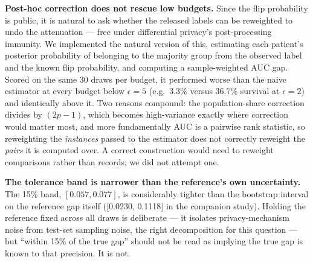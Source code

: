 \documentclass[11pt]{article}
\begin{document}
\textbf{Post-hoc correction does not rescue low budgets.} Since the flip probability is public, it is natural to ask whether the released labels can be reweighted to undo the attenuation --- free under differential privacy's post-processing immunity. We implemented the natural version of this, estimating each patient's posterior probability of belonging to the majority group from the observed label and the known flip probability, and computing a sample-weighted AUC gap. Scored on the same 30 draws per budget, it performed worse than the naive estimator at every budget below $\epsilon=5$ (e.g.\ 3.3\% versus 36.7\% survival at $\epsilon=2$) and identically above it. Two reasons compound: the population-share correction divides by $(2p-1)$, which becomes high-variance exactly where correction would matter most, and more fundamentally AUC is a pairwise rank statistic, so reweighting the \emph{instances} passed to the estimator does not correctly reweight the \emph{pairs} it is computed over. A correct construction would need to reweight comparisons rather than records; we did not attempt one.

\textbf{The tolerance band is narrower than the reference's own uncertainty.} The 15\% band, $[0.057, 0.077]$, is considerably tighter than the bootstrap interval on the reference gap itself ([0.0230, 0.1118] in the companion study). Holding the reference fixed across all draws is deliberate --- it isolates privacy-mechanism noise from test-set sampling noise, the right decomposition for this question --- but ``within 15\% of the true gap'' should not be read as implying the true gap is known to that precision. It is not.
\end{document}

